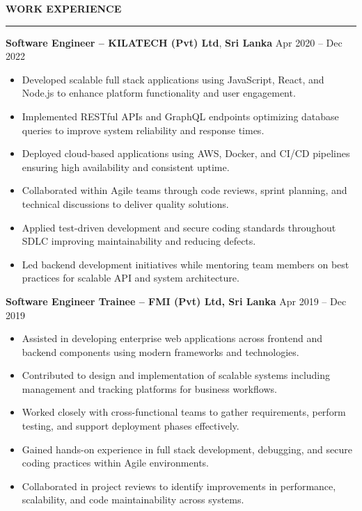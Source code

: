 \documentclass[10pt,letterpaper]{article}
\begin{document}
\vspace{8pt}

\textbf{WORK EXPERIENCE}\\[-8pt]
\noindent\rule{\textwidth}{1pt}

\vspace{-2pt}

\textbf{Software Engineer -- KILATECH (Pvt) Ltd}, \textbf{Sri Lanka} \hfill Apr 2020 -- Dec 2022

\vspace{-1pt}

\begin{itemize}
\item Developed scalable full stack applications using JavaScript, React, and Node.js to enhance platform functionality and user engagement.
\item Implemented RESTful APIs and GraphQL endpoints optimizing database queries to improve system reliability and response times.
\item Deployed cloud-based applications using AWS, Docker, and CI/CD pipelines ensuring high availability and consistent uptime.
\item Collaborated within Agile teams through code reviews, sprint planning, and technical discussions to deliver quality solutions.
\item Applied test-driven development and secure coding standards throughout SDLC improving maintainability and reducing defects.
\item Led backend development initiatives while mentoring team members on best practices for scalable API and system architecture.
\end{itemize}

\textbf{Software Engineer Trainee -- FMI (Pvt) Ltd, Sri Lanka} \hfill Apr 2019 -- Dec 2019

\vspace{-1pt}

\begin{itemize}
\item Assisted in developing enterprise web applications across frontend and backend components using modern frameworks and technologies.
\item Contributed to design and implementation of scalable systems including management and tracking platforms for business workflows.
\item Worked closely with cross-functional teams to gather requirements, perform testing, and support deployment phases effectively.
\item Gained hands-on experience in full stack development, debugging, and secure coding practices within Agile environments.
\item Collaborated in project reviews to identify improvements in performance, scalability, and code maintainability across systems.
\end{itemize}
\end{document}
